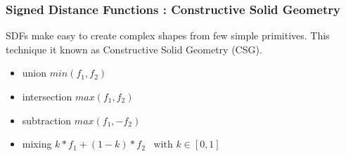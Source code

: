 \documentclass{beamer}
\begin{document}
\begin{frame}
\frametitle{Signed Distance Functions : Constructive Solid Geometry}
SDFs make easy to create complex shapes from few simple primitives.
This technique it known as Constructive Solid Geometry (CSG).
\begin{itemize}
  \item union $ min(f_1, f_2) $
  \item intersection $ max(f_1, f_2) $
  \item subtraction $ max(f_1, -f_2) $
  \item mixing $ k*f_1 + (1-k) * f_2 \;\;\; \text{with $k\in[0,1]$} $
\end{itemize}

\end{frame}









\end{document}
